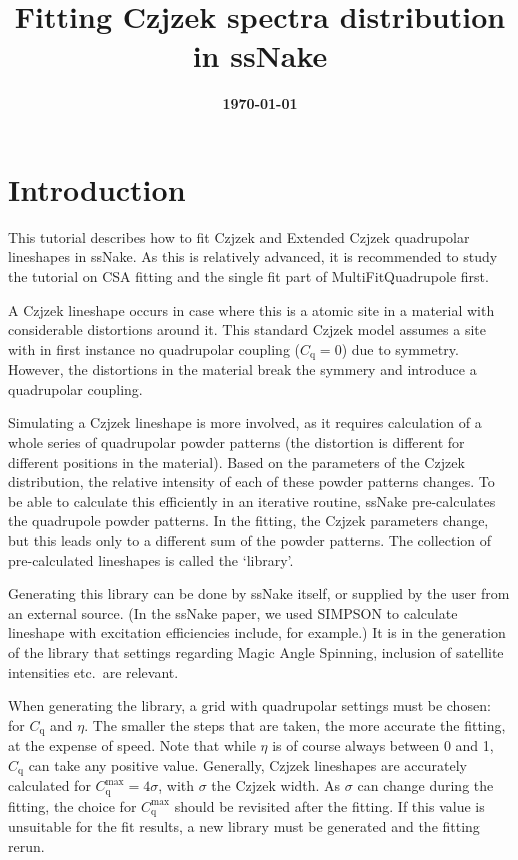 \documentclass[11pt,a4paper]{article}
\title{\color{black}\fontfamily{SourceSansPro-LF}\bfseries Fitting Czjzek spectra distribution in ssNake}
\author{}
\date{\color{black}\fontfamily{SourceSansPro-LF}\bfseries \today}
\begin{document}

\maketitle

\section{Introduction}
This tutorial describes how to fit Czjzek and Extended Czjzek quadrupolar lineshapes in ssNake. As this is relatively advanced, it is recommended to study the tutorial on CSA fitting and the single fit part of MultiFitQuadrupole first.

A Czjzek lineshape occurs in case where this is a atomic site in a material with considerable distortions around it. This standard Czjzek model assumes a site with in first instance no quadrupolar coupling ($C_\text{q}=0$) due to symmetry. However, the distortions in the material break the symmery and introduce a quadrupolar coupling.

Simulating a Czjzek lineshape is more involved, as it requires calculation of a whole series of quadrupolar powder patterns (the distortion is different for different positions in the material). Based on the parameters of the Czjzek distribution, the relative intensity of each of these powder patterns changes. To be able to calculate this efficiently in an iterative routine, ssNake pre-calculates the quadrupole powder patterns. In the fitting, the Czjzek parameters change, but this leads only to a different sum of the powder patterns. The collection of pre-calculated lineshapes is called the `library'.

Generating this library can be done by ssNake itself, or supplied by the user from an external source. (In the ssNake paper, we used SIMPSON to calculate lineshape with excitation efficiencies include, for example.) It is in the generation of the library that settings regarding Magic Angle Spinning, inclusion of satellite intensities etc.\ are relevant.

When generating the library, a grid with quadrupolar settings must be chosen: for $C_\text{q}$ and $\eta$. The smaller the steps that are taken, the more accurate the fitting, at the expense of speed. Note that while $\eta$ is of course always between 0 and 1, $C_\text{q}$ can take any positive value. Generally, Czjzek lineshapes are accurately calculated for $C_\text{q}^\text{max} = 4\sigma$, with $\sigma$ the Czjzek width. As $\sigma$ can change during the fitting, the choice for $C_\text{q}^\text{max}$ should be revisited after the fitting. If this value is unsuitable for the fit results, a new library must be generated and the fitting rerun.
\end{document}
